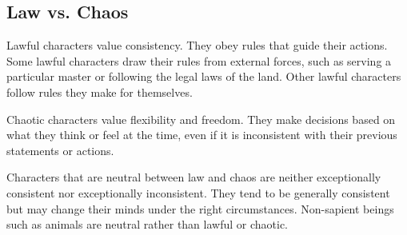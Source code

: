   \subsection{Law vs. Chaos}
     Lawful characters value consistency.
    They obey rules that guide their actions.
    Some lawful characters draw their rules from external forces, such as serving a particular master or following the legal laws of the land.
    Other lawful characters follow rules they make for themselves.

     Chaotic characters value flexibility and freedom.
    They make decisions based on what they think or feel at the time, even if it is inconsistent with their previous statements or actions.

     Characters that are neutral between law and chaos are neither exceptionally consistent nor exceptionally inconsistent.
    They tend to be generally consistent but may change their minds under the right circumstances.
    Non-sapient beings such as animals are neutral rather than lawful or chaotic.
